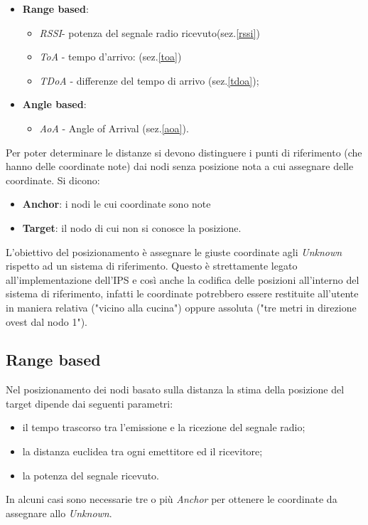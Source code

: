 	\begin{itemize}
	\item \textbf{Range based}:
	
		\begin{itemize}
		\item \textit{RSSI}- potenza del segnale radio ricevuto(sez.\ref{rssi})
		\item \textit{ToA} - tempo d’arrivo: (sez.\ref{toa})
		\item \textit{TDoA} - differenze del tempo di arrivo (sez.\ref{tdoa});
 	    \end{itemize}
     
	\item \textbf{Angle based}:
		\begin{itemize}
			\item \textit{AoA} - Angle of Arrival (sez.\ref{aoa}).
		\end{itemize}
		
\end{itemize}
Per poter determinare le distanze si devono distinguere i punti di riferimento (che hanno
delle coordinate note) dai nodi senza posizione nota a cui assegnare delle coordinate.
Si dicono:
\begin{itemize}
	\item \textbf{Anchor}: i nodi le cui coordinate sono note
	\item \textbf{Target}: il nodo di cui non si conosce la posizione.
\end{itemize}

 L’obiettivo del posizionamento è assegnare le giuste coordinate agli \textit{Unknown} rispetto ad un sistema di riferimento. Questo è strettamente legato all'implementazione dell'IPS e così anche la codifica delle posizioni all'interno del sistema di riferimento, infatti le coordinate potrebbero essere restituite all'utente in maniera relativa ("vicino alla cucina") oppure assoluta ("tre  metri in direzione ovest dal nodo 1").

\subsection{Range based}
Nel posizionamento dei nodi basato sulla distanza la stima della posizione del target dipende dai seguenti parametri:
	\begin{itemize}
	\item il tempo trascorso tra l’emissione e la ricezione del segnale radio;
	\item la distanza euclidea tra ogni emettitore ed il ricevitore;
	\item la potenza del segnale ricevuto.
\end{itemize}
In alcuni casi sono necessarie tre o più \textit{Anchor} per ottenere le coordinate da assegnare allo \textit{Unknown}.


